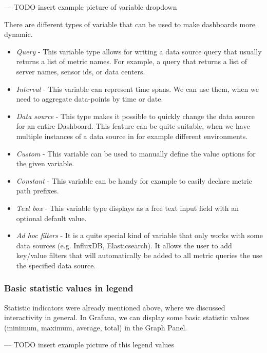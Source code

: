 \begin{center}
	--- TODO insert example picture of variable dropdown
\end{center}

There are different types of variable that can be used to make dashboards more dynamic.
\begin{itemize}
	\item \emph{Query} - This variable type allows for writing a data source query that usually returns a list of metric names. For example, a query that returns a list of server names, sensor ids, or data centers.
	\item \emph{Interval} - This variable can represent time spans. We can use them, when we need to aggregate data-points by time or date.
	\item \emph{Data source} - This type makes it possible to quickly change the data source for an entire Dashboard. This feature can be quite suitable, when we have multiple instances of a data source in for example different environments.
	\item \emph{Custom} - This variable can be used to manually define the value options for the given variable.
	\item \emph{Constant} - This variable can be handy for example to easily declare metric path prefixes. 
	\item \emph{Text box} - This variable type displays as a free text input field with an optional default value.
	\item \emph{Ad hoc filters} - It is a quite special kind of variable that only works with some data sources (e.g. InfluxDB, Elasticsearch). It allows the user to add key/value filters that will automatically be added to all metric queries the use the specified data source.
\end{itemize}

\subsubsection{Basic statistic values in legend}

Statistic indicators were already mentioned above, where we discussed interactivity in general. In Grafana, we can display some basic statistic values (minimum, maximum, average, total) in the Graph Panel.

\begin{center}
	--- TODO insert example picture of this legend values
\end{center}

